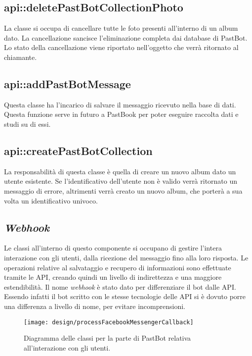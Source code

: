 \subsection{api::deletePastBotCollectionPhoto}

La classe si occupa di cancellare tutte le foto presenti all'interno di un
album dato. La cancellazione sancisce l'eliminazione completa dai database di
PastBot.
Lo stato della cancellazione viene riportato nell'oggetto che verrà ritornato
al chiamante.

\subsection{api::addPastBotMessage}

Questa classe ha l'incarico di salvare il messaggio ricevuto nella base di
dati. Questa funzione serve in futuro a PastBook per poter eseguire raccolta
dati e studi su di essi.

\subsection{api::createPastBotCollection}

La responsabilità di questa classe è quella di creare un nuovo album dato un
utente esistente. Se l'identificativo dell'utente non è valido verrà ritornato
un messaggio di errore, altrimenti verrà creato un nuovo album, che porterà a
sua volta un identificativo univoco.

\subsection{\textit{Webhook}}

Le classi all'interno di questo componente si occupano di gestire l'intera
interazione con gli utenti, dalla ricezione del messaggio fino alla loro
risposta. Le operazioni relative al salvataggio e recupero di informazioni sono
effettuate tramite le API, creando quindi un livello di indirettezza e una
maggiore estendibilità.
Il nome \textit{webhook} è stato dato per differenziare il bot dalle API.
Essendo infatti il bot scritto con le stesse tecnologie delle API si è dovuto
porre una differenza a livello di nome, per evitare incomprensioni.

\begin{figure}[H]
  \centering
  \texttt{[image: design/processFacebookMessengerCallback]}
  \caption{Diagramma delle classi per la parte di PastBot relativa
all'interazione con gli utenti.}
\end{figure}

